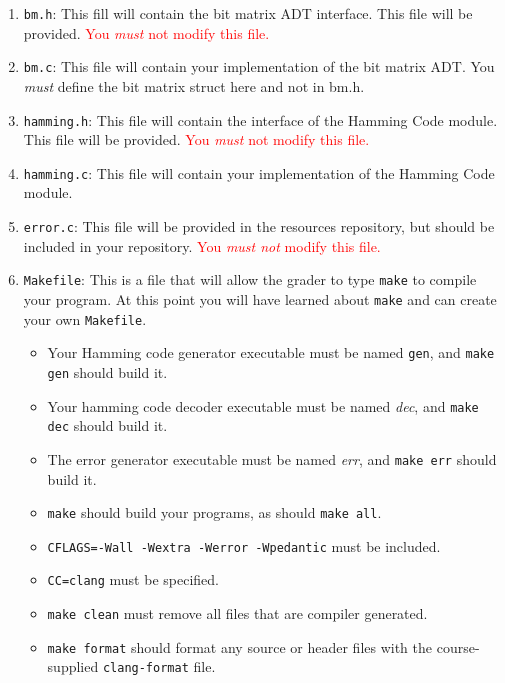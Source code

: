 \documentclass[11pt]{article}
\begin{document}
\begin{enumerate}
  \item \texttt{bm.h}: This fill will contain the bit matrix ADT interface. This file
  will be provided. \textcolor{red}{You \emph{must} not modify this file.}
  
  \item \texttt{bm.c}: This file will contain your implementation of the bit matrix ADT.
  You \emph{must} define the bit matrix struct here and not in bm.h.
    
  \item \texttt{hamming.h}: This file will contain the interface of the
    Hamming Code module. This file will be provided. \textcolor{red}{You \emph{must}
    not modify this file.}
    
  \item \texttt{hamming.c}: This file will contain your implementation of the
    Hamming Code module.
    
  \item \texttt{error.c}: This file will be provided in the resources repository, but
  should be included in your repository. \textcolor{red}{You \emph{must not} modify
  this file.}

  \item \texttt{Makefile}: This is a file that will allow the grader to type
        \texttt{make} to compile your program. At this point you will have
        learned about \texttt{make} and can create your own \texttt{Makefile}.
    \begin{itemize}
        \item Your Hamming code generator executable must be named \texttt{gen}, and
        \texttt{make gen} should build it.
        \item Your hamming code decoder executable must be named \textit{dec}, and
        \texttt{make dec} should build it.
        \item The error generator executable must be named \textit{err}, and
        \texttt{make err} should build it.
        \item \texttt{make} should build your programs, as should \texttt{make
            all}.
        \item \texttt{CFLAGS=-Wall -Wextra -Werror -Wpedantic} must be included.
        \item \texttt{CC=clang} must be specified.
        \item \texttt{make clean} must remove all files that are compiler
            generated.
        \item \texttt{make format}  should format any source or header files with the
        course-supplied \texttt{clang-format} file.
    \end{itemize}


\end{enumerate}
\end{document}
